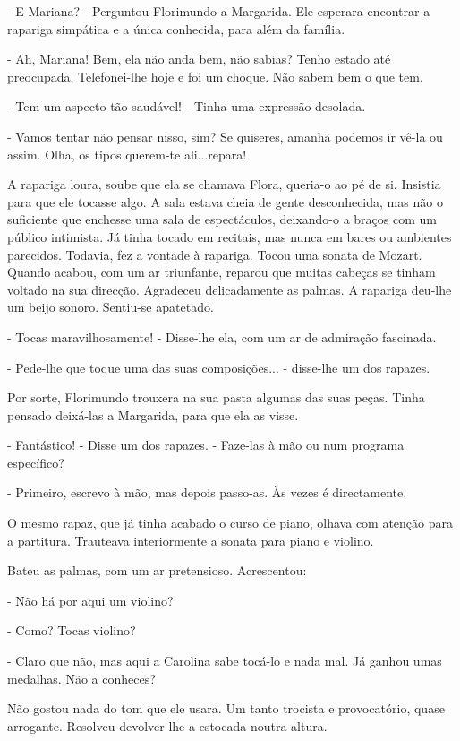 - E Mariana? - Perguntou Florimundo a Margarida. Ele esperara encontrar
a rapariga simpática e a única conhecida, para além da família.

- Ah, Mariana! Bem, ela não anda bem, não sabias? Tenho estado até
preocupada. Telefonei-lhe hoje e foi um choque. Não sabem bem o que tem.

- Tem um aspecto tão saudável! - Tinha uma expressão desolada.

- Vamos tentar não pensar nisso, sim? Se quiseres, amanhã podemos ir
vê-la ou assim. Olha, os tipos querem-te ali...repara!

A rapariga loura, soube que ela se chamava Flora, queria-o ao pé de si.
Insistia para que ele tocasse algo. A sala estava cheia de gente
desconhecida, mas não o suficiente que enchesse uma sala de
espectáculos, deixando-o a braços com um público intimista. Já tinha
tocado em recitais, mas nunca em bares ou ambientes parecidos. Todavia,
fez a vontade à rapariga. Tocou uma sonata de Mozart. Quando acabou, com
um ar triunfante, reparou que muitas cabeças se tinham voltado na sua
direcção. Agradeceu delicadamente as palmas. A rapariga deu-lhe um beijo
sonoro. Sentiu-se apatetado.

- Tocas maravilhosamente! - Disse-lhe ela, com um ar de admiração
fascinada.

- Pede-lhe que toque uma das suas composições... - disse-lhe um dos
rapazes.

Por sorte, Florimundo trouxera na sua pasta algumas das suas peças.
Tinha pensado deixá-las a Margarida, para que ela as visse.

- Fantástico! - Disse um dos rapazes. - Faze-las à mão ou num programa
específico?

- Primeiro, escrevo à mão, mas depois passo-as. Às vezes é directamente.

O mesmo rapaz, que já tinha acabado o curso de piano, olhava com atenção
para a partitura. Trauteava interiormente a sonata para piano e violino.

Bateu as palmas, com um ar pretensioso. Acrescentou:

- Não há por aqui um violino?

- Como? Tocas violino?

- Claro que não, mas aqui a Carolina sabe tocá-lo e nada mal. Já ganhou
umas medalhas. Não a conheces?

Não gostou nada do tom que ele usara. Um tanto trocista e provocatório,
quase arrogante. Resolveu devolver-lhe a estocada noutra altura.

